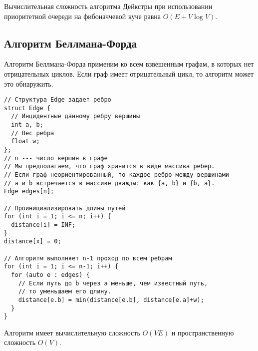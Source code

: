 Вычислительная сложность алгоритма Дейкстры при использовании приоритетной очереди
на фибоначчевой куче равна $O(E + V\log V)$.

\subsection{Алгоритм Беллмана-Форда}
Алгоритм Беллмана-Форда применим ко всем взвешенным графам, в которых нет отрицательных
циклов. Если граф имеет отрицательный цикл, то алгоритм может это обнаружить.

\begin{verbatim}
// Структура Edge задает ребро
struct Edge {
  // Инцидентные данному ребру вершины
  int a, b;
  // Вес ребра
  float w;
};
// n --- число вершин в графе
// Мы предполагаем, что граф хранится в виде массива ребер.
// Если граф неориентированный, то каждое ребро между вершинами
// a и b встречается в массиве дважды: как {a, b} и {b, a}.
Edge edges[n];

// Проинициализировать длины путей
for (int i = 1; i <= n; i++) {
  distance[i] = INF;
}
distance[x] = 0;

// Алгоритм выполняет n-1 проход по всем ребрам
for (int i = 1; i <= n-1; i++) {
  for (auto e : edges) {
    // Если путь до b через a меньше, чем известный путь,
    // то уменьшаем его длину.
    distance[e.b] = min(distance[e.b], distance[e.a]+w);
  }
}
\end{verbatim}
Алгоритм имеет вычислительную сложность $O(VE)$ и пространственную сложность $O(V)$.



  
